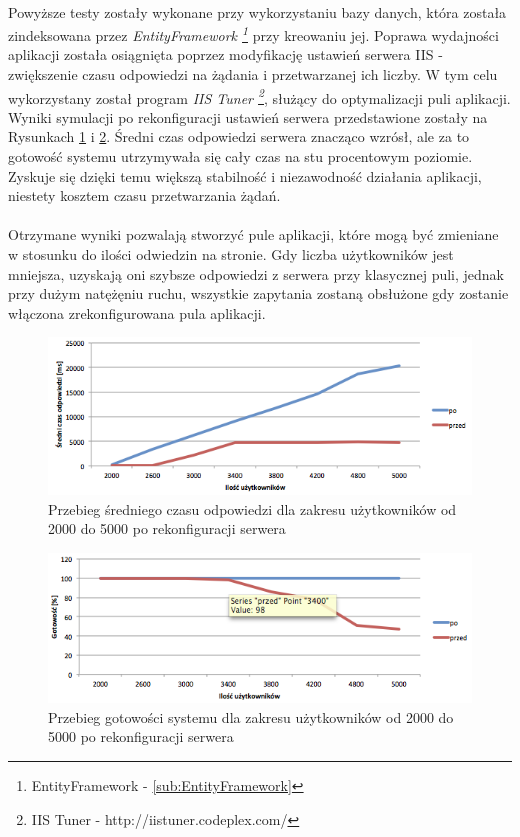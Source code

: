 \paragraph{} %
\label{par:}
Powyższe testy zostały wykonane przy wykorzystaniu bazy danych, która została zindeksowana przez \textit{EntityFramework \footnote{EntityFramework - \ref{sub:EntityFramework}}} przy kreowaniu jej. Poprawa wydajności aplikacji została osiągnięta poprzez modyfikację ustawień serwera IIS -  zwiększenie czasu odpowiedzi na żądania i przetwarzanej ich liczby. W tym celu wykorzystany został program \textit{IIS Tuner \footnote{IIS Tuner - http://iistuner.codeplex.com/}}, służący do optymalizacji puli aplikacji. Wyniki symulacji po rekonfiguracji ustawień serwera przedstawione zostały na Rysunkach \ref{fig:sred3} i \ref{fig:got3}. Średni czas odpowiedzi serwera znacząco wzrósł, ale za to gotowość systemu utrzymywała się cały czas na stu procentowym poziomie. Zyskuje się dzięki temu większą stabilność i niezawodność działania aplikacji, niestety kosztem czasu przetwarzania żądań. 
\paragraph{} %
\label{par:}
Otrzymane wyniki pozwalają stworzyć pule aplikacji, które mogą być zmieniane w stosunku do ilości odwiedzin na stronie. Gdy liczba użytkowników jest mniejsza, uzyskają oni szybsze odpowiedzi z serwera przy klasycznej puli, jednak przy dużym natężęniu ruchu, wszystkie zapytania zostaną obsłużone gdy zostanie włączona zrekonfigurowana pula aplikacji.

\begin{figure}[ht]
	\centering
		\includegraphics[width=1\linewidth]{assets/sredni3.png}
		\caption{Przebieg średniego czasu odpowiedzi dla zakresu użytkowników od 2000 do 5000 po rekonfiguracji serwera}
	\label{fig:sred3}
\end{figure}

\begin{figure}[ht]
	\centering
		\includegraphics[width=1\linewidth]{assets/gotowosc3.png}
		\caption{Przebieg gotowości systemu dla zakresu użytkowników od 2000 do 5000 po rekonfiguracji serwera}
	\label{fig:got3}
\end{figure}
